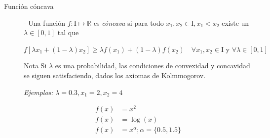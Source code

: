 \documentclass[12pt]{scrartcl}
\theoremstyle{definition}
\begin{document}
\begin{description}

	
	\item[Función cóncava] - Una función $f\colon \mathrm{I} \mapsto \mathbb{R}$ es \textit{cóncava} si para todo $x_1, x_2 \in \mathrm{I}, x_1 < x_2$ existe un $\lambda \in [0, 1]$ tal que 
	
	\begin{center}
	    $f[\lambda x_1 + (1 - \lambda)x_2] \geq \lambda f(x_1) + (1-\lambda)f(x_2)\quad \forall x_1,x_2\in \mathrm{I} \text{ y } \forall \lambda \in [0, 1]$
	\end{center}
	
	\begin{summarybox}[colback=red!15]{Nota}
    	Si $\lambda$ es una probabilidad, las condiciones de convexidad y concavidad se siguen satisfaciendo, dados los axiomas de Kolmmogorov.
	\end{summarybox}
	
	\textit{Ejemplos:} $\lambda = 0.3, x_1 = 2, x_2 = 4$

    \begin{align*}
        f(x) &= x^2\\
        f(x) &= \log(x)\\
        f(x) &= x^\alpha; \alpha = \{0.5, 1.5\}
    \end{align*}


    




\end{description}
\end{document}
